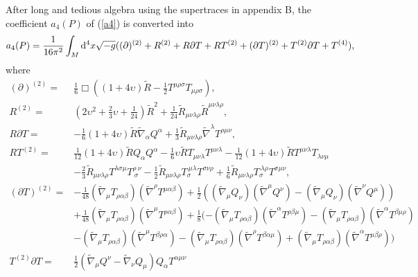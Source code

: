 \documentclass{ptephy}%
\begin{document}
After long and tedious algebra using the supertraces in appendix B, the coefficient $a_4(P)$ of (\ref{a4}) is 
converted into
\begin{equation}
 a_4(P) = \frac{1}{16\pi^2}\int_M {\rm d}^4x\sqrt{-g}((\partial)^{(2)} + R^{(2)}+R\partial T+RT^{(2)}
+(\partial T)^{(2)}+T^{(2)}\partial T +T^{(4)}),
\label{a4lambda}
\end{equation}
where
\begin{align}
(\partial)^{(2)} = & \frac{1}{6}\Box \left((1+4\upsilon)\tilde{R}
-\frac{1}{2}T^{\mu\rho\sigma}T_{\mu\rho\sigma}\right), \\
R^{(2)} =& (2\upsilon^2+\frac{2}{3}\upsilon+\frac{1}{24})\tilde{R}^2+\frac{1}{24}\tilde{R}_{\mu\nu\lambda\rho}\tilde{R}^{\mu\nu\lambda\rho}, \\
R\partial T = & -\frac{1}{6}(1+4\upsilon)\tilde{R}\tilde{\nabla}_\alpha Q^\alpha
+\frac{1}{3}\tilde{R}_{\mu\nu\lambda\rho}\tilde{\nabla}^\lambda T^{\rho\mu\nu}, \\
RT^{(2)} = & \frac{1}{12}(1+4\upsilon)\tilde{R}Q_\alpha Q^\alpha -\frac{1}{6}\upsilon\tilde{R}T_{\mu\nu\lambda}T^{\mu\nu\lambda}
-\frac{1}{12}(1+4\upsilon )\tilde{R}T^{\mu\nu\lambda}T_{\lambda\nu\mu} \nonumber \\
& - \frac{2}{3}\tilde{R}_{\mu\nu\lambda\rho}T^{\lambda\sigma\mu}T^{\rho\ \nu}_{\ \sigma} 
-\frac{1}{2}\tilde{R}_{\mu\nu\lambda\rho}T_\sigma^{\ \mu\lambda}T^{\sigma\nu\rho} 
+\frac{1}{6}\tilde{R}_{\mu\nu\lambda\rho}T_\sigma^{\ \lambda\rho}T^{\sigma\mu\nu}, \\
(\partial T)^{(2)} = & -\frac{1}{48}(\tilde{\nabla}_\mu T_{\rho\alpha\beta})(\tilde{\nabla}^\rho T^{\mu\alpha\beta})
+ \frac{1}{2}((\tilde{\nabla}_\mu Q_\nu)(\tilde{\nabla}^\mu Q^\nu) 
-(\tilde{\nabla}_\mu Q_\nu)(\tilde{\nabla}^\nu Q^\mu)) \nonumber \\
& +\frac{1}{48}(\tilde{\nabla}_\mu T_{\rho\alpha\beta})(\tilde{\nabla}^\mu T^{\rho\alpha\beta}) 
+ \frac{1}{8}(-(\tilde{\nabla}_\mu T_{\rho\alpha\beta})(\tilde{\nabla}^\alpha T^{\rho\beta\mu})
- (\tilde{\nabla}_\mu T_{\rho\alpha\beta})(\tilde{\nabla}^\alpha T^{\beta\mu\rho}) \nonumber \\
& -(\tilde{\nabla}_\mu T_{\rho\alpha\beta})(\tilde{\nabla}^\mu T^{\beta\rho\alpha})  
- (\tilde{\nabla}_\mu T_{\rho\alpha\beta})(\tilde{\nabla}^\rho T^{\beta\alpha\mu})  
+(\tilde{\nabla}_\mu T_{\rho\alpha\beta})(\tilde{\nabla}^\alpha T^{\mu\beta\rho}) 
) \\
T^{(2)}\partial T = & \frac{1}{2}(\tilde{\nabla}_\mu Q^\nu - \tilde{\nabla}_\nu Q_\mu)Q_\alpha T^{\alpha\mu\nu} 

\end{align}
\end{document}
